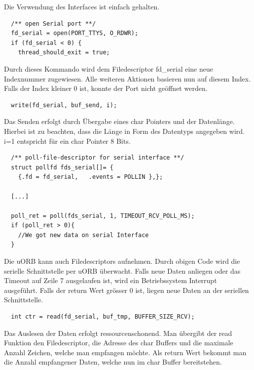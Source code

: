 \noindent Die Verwendung des Interfaces ist einfach gehalten.

\begin{lstlisting}
  /** open Serial port **/
  fd_serial = open(PORT_TTYS, O_RDWR);
  if (fd_serial < 0) {
    thread_should_exit = true;
\end{lstlisting}
Durch dieses Kommando wird dem Filedescriptor fd\_serial eine neue Indexnummer zugewiesen. Alle weiteren Aktionen basieren nun auf diesem Index. Falls der Index kleiner 0 ist, konnte der Port nicht geöffnet werden.\\

\begin{lstlisting}
  write(fd_serial, buf_send, i);
\end{lstlisting}
Das Senden erfolgt durch Übergabe eines char Pointers und der Datenlänge. Hierbei ist zu beachten, dass die Länge in Form des Datentyps angegeben wird. i=1 entspricht für ein char Pointer 8 Bits.\\


\begin{lstlisting}
  /** poll-file-descriptor for serial interface **/
  struct pollfd fds_serial[]= {
    {.fd = fd_serial,   .events = POLLIN },};

  [...]

  poll_ret = poll(fds_serial, 1, TIMEOUT_RCV_POLL_MS);
  if (poll_ret > 0){
    //We got new data on serial Interface
  }
\end{lstlisting}
Die uORB kann auch Filedescriptors aufnehmen. Durch obigen Code wird die serielle Schnittstelle per uORB überwacht. Falls neue Daten anliegen oder das Timeout auf Zeile 7 ausgelaufen ist, wird ein Betriebssystem Interrupt ausgeführt. Falls der return Wert grösser 0 ist, liegen neue Daten an der seriellen Schnittstelle.\\


\begin{lstlisting}
  int ctr = read(fd_serial, buf_tmp, BUFFER_SIZE_RCV);
\end{lstlisting}
Das Auslesen der Daten erfolgt ressourcenschonend. Man übergibt der read Funktion den Filedescriptor, die Adresse des char Buffers und die maximale Anzahl Zeichen, welche man empfangen möchte. Als return Wert bekommt man die Anzahl empfangener Daten, welche nun im char Buffer bereitstehen. 

\clearpage
